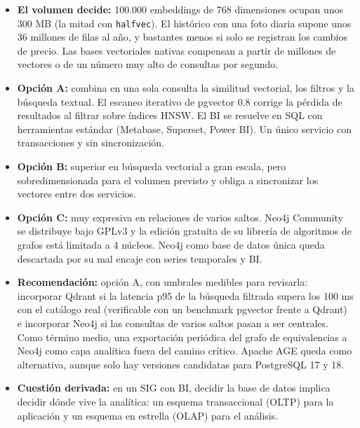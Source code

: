 \begin{tcolorbox}[colback=responsecolor, title=Insights de Claude, colframe=gray!60!black, breakable]
	\begin{itemize}
		\item \textbf{El volumen decide:} 100.000 embeddings de 768 dimensiones ocupan unos 300 MB (la mitad con \texttt{halfvec}). El histórico con una foto diaria supone unos 36 millones de filas al año, y bastantes menos si solo se registran los cambios de precio. Las bases vectoriales nativas compensan a partir de millones de vectores o de un número muy alto de consultas por segundo.

		\item \textbf{Opción A:} combina en una sola consulta la similitud vectorial, los filtros y la búsqueda textual. El escaneo iterativo de pgvector 0.8 corrige la pérdida de resultados al filtrar sobre índices HNSW. El BI se resuelve en SQL con herramientas estándar (Metabase, Superset, Power BI). Un único servicio con transacciones y sin sincronización.

		\item \textbf{Opción B:} superior en búsqueda vectorial a gran escala, pero sobredimensionada para el volumen previsto y obliga a sincronizar los vectores entre dos servicios.

		\item \textbf{Opción C:} muy expresiva en relaciones de varios saltos. Neo4j Community se distribuye bajo GPLv3 y la edición gratuita de su librería de algoritmos de grafos está limitada a 4 núcleos. Neo4j como base de datos única queda descartada por su mal encaje con series temporales y BI.

		\item \textbf{Recomendación:} opción A, con umbrales medibles para revisarla: incorporar Qdrant si la latencia p95 de la búsqueda filtrada supera los 100 ms con el catálogo real (verificable con un benchmark pgvector frente a Qdrant) e incorporar Neo4j si las consultas de varios saltos pasan a ser centrales. Como término medio, una exportación periódica del grafo de equivalencias a Neo4j como capa analítica fuera del camino crítico. Apache AGE queda como alternativa, aunque solo hay versiones candidatas para PostgreSQL 17 y 18.

		\item \textbf{Cuestión derivada:} en un SIG con BI, decidir la base de datos implica decidir dónde vive la analítica: un esquema transaccional (OLTP) para la aplicación y un esquema en estrella (OLAP) para el análisis.
	\end{itemize}
\end{tcolorbox}

